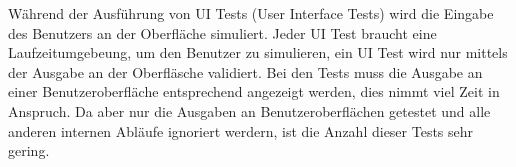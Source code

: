 Während der Ausführung von UI Tests (User Interface Tests) wird die Eingabe des Benutzers an der Oberfläche simuliert.
Jeder UI Test braucht eine Laufzeitumgebeung, um den Benutzer zu simulieren, 
ein UI Test wird nur mittels der Ausgabe an der Oberfläsche validiert. 
Bei den Tests muss die Ausgabe an einer Benutzeroberfläche entsprechend angezeigt werden, dies nimmt viel Zeit in Anspruch.
Da aber nur die Ausgaben an Benutzeroberflächen getestet und alle anderen internen Abläufe ignoriert werdern, ist die Anzahl dieser Tests sehr gering.